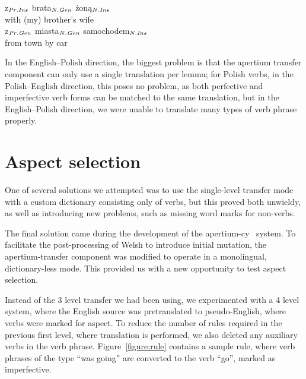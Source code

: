 \documentclass[11pt]{article}
\begin{document}
\begin{center}
\begin{table}[htdp]
z$_{\it Pr.Ins}$ brata$_{\it N.Gen}$ {\.{z}on\k{a}}$_{\it N.Ins}$ \\
with (my) brother's wife \\
z$_{\it Pr.Gen}$ miasta$_{\it N.Gen}$ samochodem$_{\it N.Ins}$\\
from town by car
\end{table}
\end{center}

In the English--Polish direction, the biggest problem is that the
apertium transfer component can only use a single translation per lemma;
for Polish verbs, in the Polish--English direction, this poses no problem,
as both perfective and imperfective verb forms can be matched to the
same translation, but in the English--Polish direction, we were unable to
translate many types of verb phrase properly.

\section{Aspect selection}

One of several solutions we attempted was to use the single-level transfer
mode with a custom dictionary consisting only of verbs, but this proved both
unwieldy, as well as introducing new problems, such as missing word marks for
non-verbs.

The final solution came during the development of the apertium-cy~\cite{tyers2009acd}
system. To facilitate the post-processing of Welsh to introduce initial mutation, the
apertium-transfer component was modified to operate in a monolingual, dictionary-less
mode. This provided us with a new opportunity to test aspect selection.

Instead of the 3 level transfer we had been using, we experimented with a 4 level
system, where the English source was pretranslated to pseudo-English, where verbs
were marked for aspect. To reduce the number of rules required in the previous
first level, where translation is performed, we also deleted any auxiliary verbs in
the verb phrase. Figure~\ref{figure:rule} contains a sample rule, where verb 
phrases of the type ``was going'' are converted to the verb ``go'', marked as
imperfective.
\end{document}
